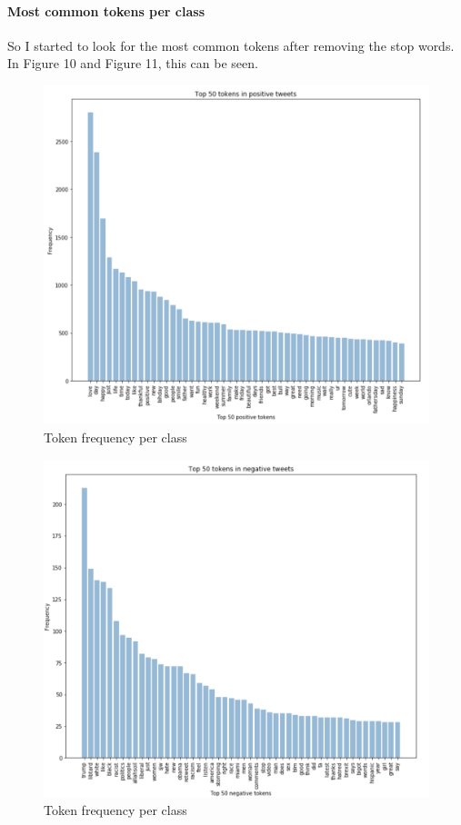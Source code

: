 \documentclass{article}
\begin{document}
	\paragraph{Most common tokens per class}
	
	So I started to look for the most common tokens after removing the stop words. In Figure 10 and Figure 11, this can be seen. 
		
	\begin{figure}[h]
		\label{Figure 10}
		\caption{Token frequency per class}
		\includegraphics[scale=0.3]{posfreq.png}
		\centering
	\end{figure}
	
			
	\begin{figure}[h]
		\label{Figure 11}
		\caption{Token frequency per class}
		\includegraphics[scale=0.3]{negfreq.png}
		\centering
	\end{figure}
	
\end{document}

